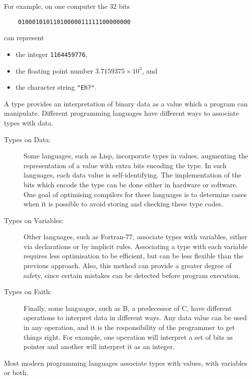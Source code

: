 For example, on one computer the 32 bits

\begin{verbatim}
    01000101011010000011111100000000
\end{verbatim}

can represent

\begin{itemize}
\item the integer \verb"1164459776",
\item the floating point number $3.7159375 \times 10^3$, and
\item the character string \verb+"Eh?"+.
\end{itemize}

A type provides an interpretation of binary data as a value which
a program can manipulate.
Different programming languages have different ways to associate types
with data.

\begin{description}

\item[Types on Data:]
Some languages, such as Lisp, incorporate types in values,
augmenting the representation of a value with extra bits encoding
the type.  In such languages, each data value is self-identifying.
The implementation of the bits which encode the type
can be done either in hardware or software.
One goal of optimising compilers for these languages is to determine cases
when it is possible to avoid storing and checking these type codes.

\item[Types on Variables:]
Other languages, such as Fortran-77, associate types with variables,
either via declarations or by implicit rules.
Associating a type with each variable
requires less optimisation to be efficient, but can be less flexible
than the previous approach.  Also, this method can provide a greater degree
of safety, since certain mistakes can be detected before program execution.

\item[Types on Faith:]
Finally, some languages, such as B, a predecessor of C, have different
operations to interpret data in different ways.  
Any data value can be used in any operation, and it is the
responsibility of the programmer to get things right.
For example, one operation will interpret a set of bits as  pointer
and another will interpret it as an integer.
\end{description}
Most modern programming languages associate types with values,
with variables or both.

